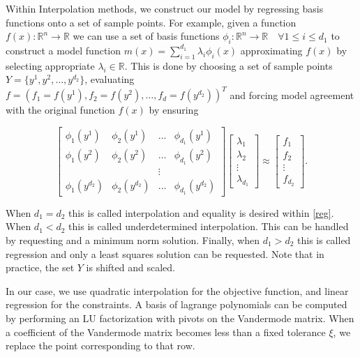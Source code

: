 \documentclass{article}
\begin{document}
Within Interpolation methods, we construct our model by regressing basis functions onto a set of sample points.
For example, given a function $f(x) : \mathbb R^n \to \mathbb R$ we can use a set of basis functions $\phi_i : \mathbb R^n \to \mathbb R \quad \forall 1 \le i \le d_1$ to construct a model function $m(x) = \sum_{i=1}^{d_1} \lambda_i \phi_i(x)$ approximating $f(x)$ by selecting appropriate $\lambda_i \in \mathbb R$.
This is done by choosing a set of sample points
$Y = \{y^1, y^2, \ldots, y^{d_2}\}$,
evaluating $f = (f_1 = f(y^1), f_2 = f(y^2), \ldots, f_d = f(y^{d_2}))^T$ and forcing model agreement with the original function $f(x)$ by ensuring

\begin{equation}
\label{reg}
\begin{bmatrix}
    \phi_1(y^1)      & \phi_2(y^1)       & \ldots & \phi_{d_1}(y^1)      \\
    \phi_1(y^2)      & \phi_2(y^2)       & \dots  & \phi_{d_1}(y^2)      \\
                     &                   & \vdots &                      \\
    \phi_1(y^{d_2})  & \phi_2(y^{d_2})   & \ldots & \phi_{d_1}(y^{d_2})
\end{bmatrix}
\begin{bmatrix}
    \lambda_1      \\
    \lambda_2      \\
    \vdots         \\            
    \lambda_{d_1}
\end{bmatrix}
\approx
\begin{bmatrix}
    f_1      \\
    f_2      \\
    \vdots         \\            
    f_{d_2}
\end{bmatrix}.
\end{equation}

When $d_1 = d_2$ this is called interpolation and equality is desired within \ref{reg}.
When $d_1 < d_2$ this is called underdetermined interpolation.
This can be handled by requesting and a minimum norm solution.
Finally, when $d_1 > d_2$ this is called regression and only a least squares solution can be requested.
Note that in practice, the set $Y$ is shifted and scaled.

In our case, we use quadratic interpolation for the objective function, and linear regression for the constraints.
A basis of lagrange polynomials can be computed by performing an LU factorization with pivots on the Vandermode matrix.
When a coefficient of the Vandermode matrix becomes less than a fixed tolerance $\xi$, we replace the point corresponding to that row.
\end{document}
